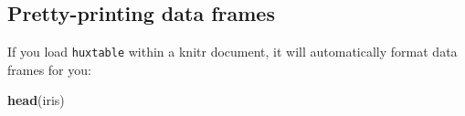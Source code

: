\documentclass[]{article}
\newenvironment{Shaded}{\begin{snugshade}}{\end{snugshade}}
\newcommand{\KeywordTok}[1]{\textcolor[rgb]{0.13,0.29,0.53}{\textbf{#1}}}
\newcommand{\NormalTok}[1]{#1}
\begin{document}
\hypertarget{pretty-printing-data-frames}{%
\subsection{Pretty-printing data
frames}\label{pretty-printing-data-frames}}

If you load \texttt{huxtable} within a knitr document, it will
automatically format data frames for you:

\begin{Shaded}
\begin{Highlighting}[]
\KeywordTok{head}\NormalTok{(iris)}
\end{Highlighting}
\end{Shaded}

 
  \providecommand{\huxb}[2]{\arrayrulecolor[RGB]{#1}\global\arrayrulewidth=#2pt}
  \providecommand{\huxvb}[2]{\color[RGB]{#1}\vrule width #2pt}
  \providecommand{\huxtpad}[1]{\rule{0pt}{#1}}
  \providecommand{\huxbpad}[1]{\rule[-#1]{0pt}{#1}}
\end{document}
